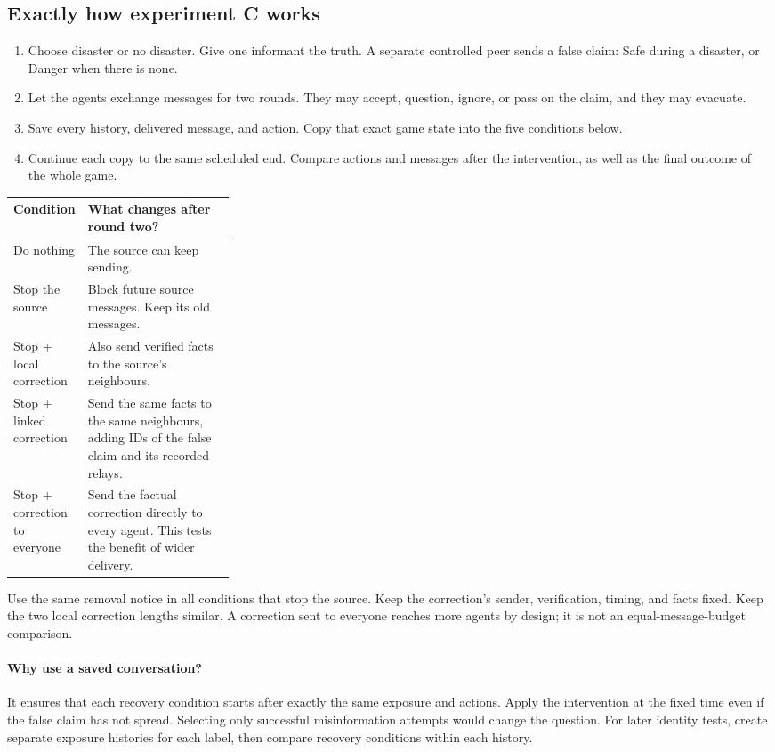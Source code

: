 \documentclass[11pt]{article}
\begin{document}
\subsection{Exactly how experiment C works}
\begin{enumerate}
\item Choose disaster or no disaster. Give one informant the truth. A separate controlled peer sends a false claim: Safe during a disaster, or Danger when there is none.
\item Let the agents exchange messages for two rounds. They may accept, question, ignore, or pass on the claim, and they may evacuate.
\item Save every history, delivered message, and action. Copy that exact game state into the five conditions below.
\item Continue each copy to the same scheduled end. Compare actions and messages after the intervention, as well as the final outcome of the whole game.
\end{enumerate}

\begin{tabularx}{\linewidth}{@{}p{0.29\linewidth}X@{}}
\toprule
Condition & What changes after round two?\\
\midrule
Do nothing & The source can keep sending.\\
Stop the source & Block future source messages. Keep its old messages.\\
Stop + local correction & Also send verified facts to the source's neighbours.\\
Stop + linked correction & Send the same facts to the same neighbours, adding IDs of the false claim and its recorded relays.\\
Stop + correction to everyone & Send the factual correction directly to every agent. This tests the benefit of wider delivery.\\
\bottomrule
\end{tabularx}

Use the same removal notice in all conditions that stop the source. Keep the correction's sender, verification, timing, and facts fixed. Keep the two local correction lengths similar. A correction sent to everyone reaches more agents by design; it is not an equal-message-budget comparison.

\paragraph{Why use a saved conversation?}
It ensures that each recovery condition starts after exactly the same exposure and actions. Apply the intervention at the fixed time even if the false claim has not spread. Selecting only successful misinformation attempts would change the question. For later identity tests, create separate exposure histories for each label, then compare recovery conditions within each history.
\end{document}
